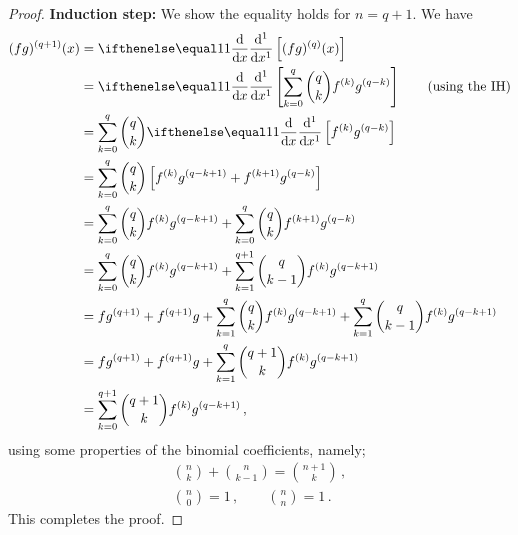 \documentclass[week=6]{homework}
\begin{document}
\begin{questions}
\begin{proof}
	    	\textbf{Induction step:}
	    	We show the equality holds for $n=q+1$. We have
	    	\begin{align*}
		    	(fg)^{(q+1)}(x) &= \diff{}\left[ (fg)^{(q)}(x) \right] \\
		    	&= \diff{} \left[ \sum_{k=0}^{q} {q\choose k} f^{(k)}g^{(q-k)} \right] \qquad \mbox{(using the IH)} \\
		    	&= \sum_{k=0}^{q} {q\choose k} \diff{} \left[ f^{(k)}g^{(q-k)} \right] \\
		    	&= \sum_{k=0}^{q} {q\choose k} \left[f^{(k)}g^{(q-k+1)} + f^{(k+1)}g^{(q-k)}\right] \\
		    	&= \sum_{k=0}^{q} {q\choose k} f^{(k)}g^{(q-k+1)} + \sum_{k=0}^{q} {q\choose k} f^{(k+1)}g^{(q-k)} \\
		    	&= \sum_{k=0}^{q} {q\choose k} f^{(k)}g^{(q-k+1)} + \sum_{k=1}^{q+1} {q\choose k-1} f^{(k)}g^{(q-k+1)} \\
		    	&= fg^{(q+1)} + f^{(q+1)}g + \sum_{k=1}^{q} {q\choose k} f^{(k)}g^{(q-k+1)} + \sum_{k=1}^{q} {q\choose k-1} f^{(k)}g^{(q-k+1)} \\
		    	&= fg^{(q+1)} + f^{(q+1)}g + \sum_{k=1}^{q} {q+ 1 \choose k} f^{(k)}g^{(q-k+1)} \\
		    	&= \sum_{k=0}^{q+1} {q+ 1 \choose k} f^{(k)}g^{(q-k+1)}\,,
	    	\end{align*}
	    	using some properties of the binomial coefficients, namely;
	    	\begin{gather*}
	    		{n \choose k} + {n \choose k-1} = {n+1 \choose k} \,, \\
	    		{n \choose 0} = 1 \,, \qquad {n \choose n} = 1\,.
	    	\end{gather*}
	    	This completes the proof.
	    \end{proof}
     \end{questions}
\end{document}
